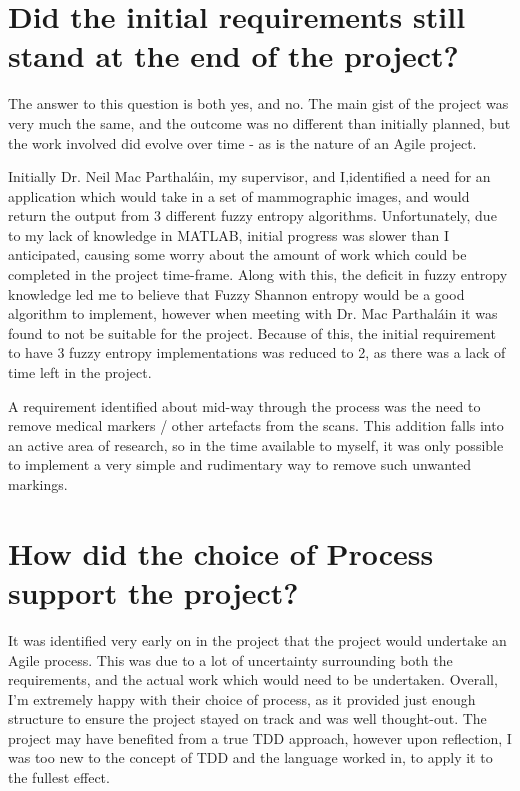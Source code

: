 \section{Did the initial requirements still stand at the end of the project?}

The answer to this question is both yes, and no. The main gist of the project was very much the same, and the outcome was no different than initially planned, but the work involved did evolve over time - as is the nature of an Agile project.

Initially Dr. Neil Mac Parthal\'ain, my supervisor, and I,identified a need for an application which would take in a set of mammographic images, and would return the output from 3 different fuzzy entropy algorithms. Unfortunately, due to my lack of knowledge in MATLAB, initial progress was slower than I anticipated, causing some worry about the amount of work which could be completed in the project time-frame. Along with this, the deficit in fuzzy entropy knowledge led me to believe that Fuzzy Shannon entropy would be a good algorithm to implement, however when meeting with Dr. Mac Parthal\'ain it was found to not be suitable for the project. Because of this, the initial requirement to have 3 fuzzy entropy implementations was reduced to 2, as there was a lack of time left in the project.

A requirement identified about mid-way through the process was the need to remove medical markers / other artefacts from the scans. This addition falls into an active area of research, so in the time available to myself, it was only possible to implement a very simple and rudimentary way to remove such unwanted markings.

\section{How did the choice of Process support the project?}

It was identified very early on in the project that the project would undertake an Agile process. This was due to a lot of uncertainty surrounding both the requirements, and the actual work which would need to be undertaken. Overall, I'm extremely happy with their choice of process, as it provided just enough structure to ensure the project stayed on track and was well thought-out. The project may have benefited from a true \acrshort{TDD} approach, however upon reflection, I was too new to the concept of \acrshort{TDD} and the language worked in, to apply it to the fullest effect.

